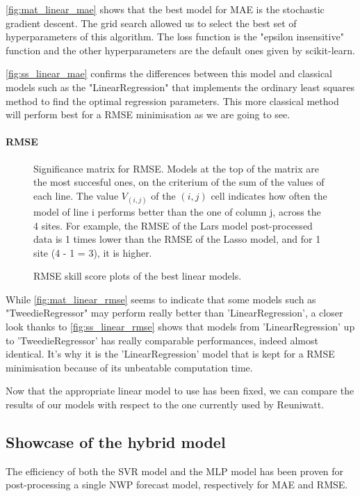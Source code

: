\autoref{fig:mat_linear_mae} shows that the best model for MAE is the stochastic gradient descent. 
The grid search allowed us to select the best set of hyperparameters of this algorithm.
The loss function is the "epsilon insensitive" function and the other hyperparameters are the default ones given by scikit-learn.

\autoref{fig:ss_linear_mae} confirms the differences between this model and classical models such as the "LinearRegression" that implements the ordinary least squares method to find the optimal regression parameters. This more classical method will perform best for a RMSE minimisation as we are going to see.
\paragraph{RMSE}
\begin{figure}[htb!]
    \centering
    
\caption{Significance matrix for RMSE. Models at the top of the matrix are the most succesful ones, on the criterium of the sum of the values of each line. The value $V_{(i,j)}$ of the $(i,j)$ cell indicates how often the model of line i performs better than the one of column j, across the 
4 sites. For example, the RMSE of the Lars model post-processed data is 1 times lower than the RMSE of the Lasso model, and for 1 site (4 - 1 = 3), it is higher.}
\label{fig:mat_linear_rmse}
\end{figure}

\begin{figure}[htb!]
    \centering
    
\caption{RMSE skill score plots of the best linear models.}
\label{fig:ss_linear_rmse}
\end{figure}

While \autoref{fig:mat_linear_rmse} seems to indicate that some models such as "TweedieRegressor" may perform really better than 'LinearRegression', a closer look thanks to \autoref{fig:ss_linear_rmse} shows that models from 'LinearRegression' up to 'TweedieRegressor' has really comparable performances, indeed almost identical. It's why it is the 'LinearRegression' model that is kept for a RMSE minimisation because of its unbeatable computation time.

Now that the appropriate linear model to use has been fixed, we can compare the results of our models with respect to the one currently used by Reuniwatt.  
\subsection{Showcase of the hybrid model}
The efficiency of both the SVR model and the MLP model has been proven for post-processing a single NWP forecast model, respectively for MAE and RMSE.

